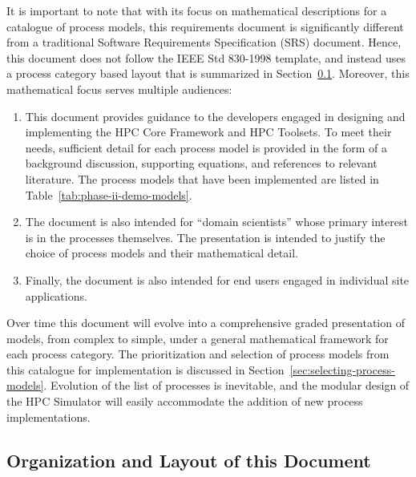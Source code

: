 It is important to note that with its focus on mathematical
descriptions for a catalogue of process models, this requirements
document is significantly different from a traditional Software
Requirements Specification (SRS) document.  Hence, this document does
not follow the IEEE Std 830-1998 template, and instead uses a process
category based layout that is summarized in Section~\ref{sec:layout}.
Moreover, this mathematical focus serves multiple audiences:
%
\begin{enumerate}
\item 
  This document provides guidance to the developers engaged in
  designing and implementing the HPC Core Framework and HPC Toolsets.
  To meet their needs, sufficient detail for each process model is
  provided in the form of a background discussion, supporting equations, 
  and references to relevant literature.  
  The process models that have been implemented are listed in
  Table~\ref{tab:phase-ii-demo-models}.
\item 
  The document is also intended for ``domain scientists'' whose
  primary interest is in the processes themselves.  The presentation
  is intended to justify the choice of process models and their
  mathematical detail.
\item 
  Finally, the document is also intended for end users engaged in
  individual site applications.
\end{enumerate}
%
Over time this document will evolve into a comprehensive graded
presentation of models, from complex to simple, under a general
mathematical framework for each process category.  The prioritization
and selection of process models from this catalogue for implementation
is discussed in Section~\ref{sec:selecting-process-models}.
%
Evolution of the list of processes is inevitable, and the modular
design of the HPC Simulator will easily accommodate the addition of
new process implementations. 



\subsection{Organization and Layout of this Document}
\label{sec:layout}

